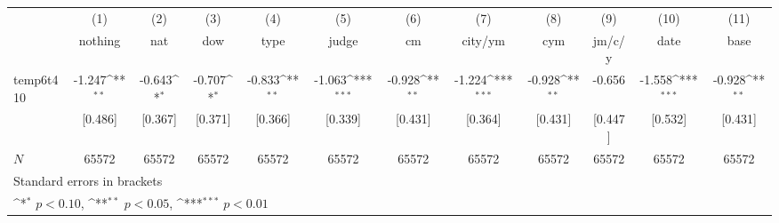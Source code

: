 {
\def\sym#1{\ifmmode^{#1}\else\(^{#1}\)\fi}
\begin{tabular}{l*{11}{c}}
\hline\hline
            &\multicolumn{1}{c}{(1)}&\multicolumn{1}{c}{(2)}&\multicolumn{1}{c}{(3)}&\multicolumn{1}{c}{(4)}&\multicolumn{1}{c}{(5)}&\multicolumn{1}{c}{(6)}&\multicolumn{1}{c}{(7)}&\multicolumn{1}{c}{(8)}&\multicolumn{1}{c}{(9)}&\multicolumn{1}{c}{(10)}&\multicolumn{1}{c}{(11)}\\
            &\multicolumn{1}{c}{nothing}&\multicolumn{1}{c}{nat}&\multicolumn{1}{c}{dow}&\multicolumn{1}{c}{type}&\multicolumn{1}{c}{judge}&\multicolumn{1}{c}{cm}&\multicolumn{1}{c}{city/ym}&\multicolumn{1}{c}{cym}&\multicolumn{1}{c}{jm/c/y}&\multicolumn{1}{c}{date}&\multicolumn{1}{c}{base}\\
\hline
temp6t410   &      -1.247\sym{**} &      -0.643\sym{*}  &      -0.707\sym{*}  &      -0.833\sym{**} &      -1.063\sym{***}&      -0.928\sym{**} &      -1.224\sym{***}&      -0.928\sym{**} &      -0.656         &      -1.558\sym{***}&      -0.928\sym{**} \\
            &     [0.486]         &     [0.367]         &     [0.371]         &     [0.366]         &     [0.339]         &     [0.431]         &     [0.364]         &     [0.431]         &     [0.447]         &     [0.532]         &     [0.431]         \\
\hline
\(N\)       &       65572         &       65572         &       65572         &       65572         &       65572         &       65572         &       65572         &       65572         &       65572         &       65572         &       65572         \\
\hline\hline
\multicolumn{12}{l}{\footnotesize Standard errors in brackets}\\
\multicolumn{12}{l}{\footnotesize \sym{*} \(p<0.10\), \sym{**} \(p<0.05\), \sym{***} \(p<0.01\)}\\
\end{tabular}
}
